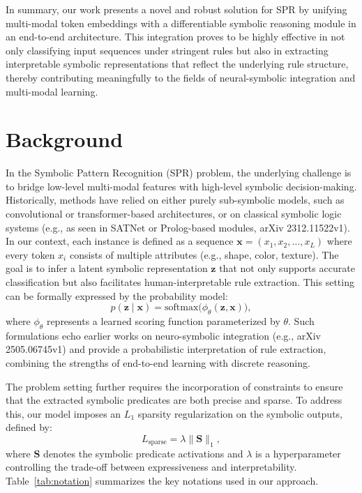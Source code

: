 \documentclass{article}
\begin{document}
In summary, our work presents a novel and robust solution for SPR by unifying multi-modal token embeddings with a differentiable symbolic reasoning module in an end-to-end architecture. This integration proves to be highly effective in not only classifying input sequences under stringent rules but also in extracting interpretable symbolic representations that reflect the underlying rule structure, thereby contributing meaningfully to the fields of neural-symbolic integration and multi-modal learning.

\section{Background}
In the Symbolic Pattern Recognition (SPR) problem, the underlying challenge is to bridge low-level multi-modal features with high-level symbolic decision-making. Historically, methods have relied on either purely sub-symbolic models, such as convolutional or transformer-based architectures, or on classical symbolic logic systems (e.g., as seen in SATNet or Prolog-based modules, arXiv 2312.11522v1). In our context, each instance is defined as a sequence \(\mathbf{x} = (x_1, x_2, \ldots, x_L)\) where every token \(x_i\) consists of multiple attributes (e.g., shape, color, texture). The goal is to infer a latent symbolic representation \(\mathbf{z}\) that not only supports accurate classification but also facilitates human-interpretable rule extraction. This setting can be formally expressed by the probability model:
\[
p(\mathbf{z}\mid\mathbf{x}) = \mathrm{softmax}\bigl(\phi_\theta(\mathbf{z}, \mathbf{x})\bigr),
\]
where \(\phi_\theta\) represents a learned scoring function parameterized by \(\theta\). Such formulations echo earlier works on neuro-symbolic integration (e.g., arXiv 2505.06745v1) and provide a probabilistic interpretation of rule extraction, combining the strengths of end-to-end learning with discrete reasoning.

The problem setting further requires the incorporation of constraints to ensure that the extracted symbolic predicates are both precise and sparse. To address this, our model imposes an \(L_1\) sparsity regularization on the symbolic outputs, defined by:
\[
L_{\text{sparse}} = \lambda \|\mathbf{S}\|_1,
\]
where \(\mathbf{S}\) denotes the symbolic predicate activations and \(\lambda\) is a hyperparameter controlling the trade-off between expressiveness and interpretability. Table~\ref{tab:notation} summarizes the key notations used in our approach.
\end{document}

